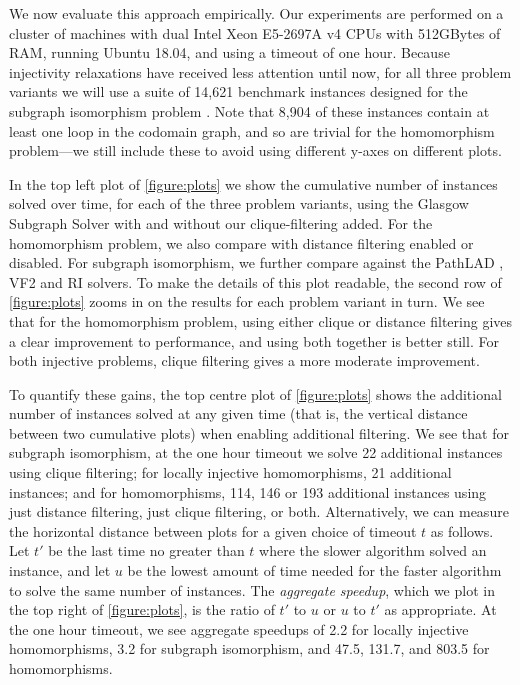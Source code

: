 \documentclass{article}
\begin{document}
We now evaluate this approach empirically. Our experiments are performed on a cluster of machines
with dual Intel Xeon E5-2697A v4 CPUs with 512GBytes of RAM, running Ubuntu 18.04, and using a
timeout of one hour. Because injectivity relaxations have received less attention until now, for all
three problem variants we will use a suite of 14,621 benchmark instances designed for the subgraph
isomorphism problem \cite{DBLP:conf/lion/KotthoffMS16}. Note that 8,904 of these instances contain
at least one loop in the codomain graph, and so are trivial for the homomorphism problem---we still
include these to avoid using different y-axes on different plots.

In the top left plot of \cref{figure:plots} we show the cumulative number of instances solved over
time, for each of the three problem variants, using the Glasgow Subgraph Solver with and without our
clique-filtering added. For the homomorphism problem, we also compare with distance filtering
enabled or disabled. For subgraph isomorphism, we further compare against the PathLAD
\cite{DBLP:conf/lion/KotthoffMS16}, VF2 \cite{DBLP:journals/pami/CordellaFSV04} and RI
\cite{DBLP:journals/bmcbi/BonniciGPSF13} solvers. To make the details of this plot readable, the
second row of \cref{figure:plots} zooms in on the results for each
problem variant in turn. We see that for the homomorphism problem, using either clique or
distance filtering gives a clear improvement to performance, and using both together is better
still. For both injective problems, clique filtering gives a more moderate improvement.

To quantify these gains, the top centre plot of \cref{figure:plots} shows the
additional number of instances solved at any given time (that is, the vertical distance between
two cumulative plots) when enabling additional filtering. We see that for subgraph isomorphism, at
the one hour timeout we solve 22 additional instances using clique filtering; for locally injective
homomorphisms, 21 additional instances; and for homomorphisms, 114, 146 or 193 additional instances
using just distance filtering, just clique filtering, or both. Alternatively, we can measure the
horizontal distance between plots for a given choice of timeout $t$ as follows. Let $t'$
be the last time no greater than $t$ where the slower algorithm solved an instance, and let $u$ be
the lowest amount of time needed for the faster algorithm to solve the same number of instances.
The \emph{aggregate speedup}, which we plot in the top right of \cref{figure:plots}, is the ratio of
$t'$ to $u$ or $u$ to $t'$ as appropriate. At the one hour timeout, we see aggregate speedups of 2.2
for locally injective homomorphisms, 3.2 for subgraph isomorphism, and 47.5, 131.7, and 803.5 for
homomorphisms.
\end{document}
